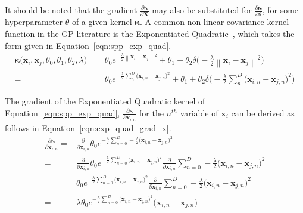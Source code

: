 It should be noted that the gradient \( \frac{\partial \bm{\kappa}}{\partial \bm{X}} \)
may also be substituted for \( \frac{\partial \bm{\kappa}}{\partial \theta} \), for 
some hyperparameter \( \theta \) of a given kernel \( \bm{\kappa} \). A common non-linear covariance 
kernel function in the GP literature is the Exponentiated Quadratic~\cite{Lawrence2005}, which takes 
the form given in Equation~\ref{eqn:spp_exp_quad}.
\begin{align}
  \label{eqn:spp_exp_quad}
  \bm{\kappa} \big( \bm{x}_{i}, \bm{x}_{j}, \theta_{0}, 
  \theta_{1}, \theta_{2}, \lambda \big) ={}&
  \theta_{0} e^{-\frac{\lambda}{2} 
  \left\lVert \bm{x}_{i} - \bm{x}_{j} \right\rVert^{2}}
  + \theta_{1} + \theta_{2} \delta \big( -\frac{\lambda}{2} 
  \left\lVert \bm{x}_{i} - \bm{x}_{j} \right\rVert^{2} \big)\\
  ={}& \theta_{0} e^{-\frac{\lambda}{2} 
  \sum_{n}^{D} {\big( \bm{x}_{i, n} - \bm{x}_{j, n} \big)}^{2}}
  + \theta_{1} + \theta_{2} \delta \big( -\frac{\lambda}{2} 
  \sum_{n}^{D} {\big( \bm{x}_{i, n} - \bm{x}_{j, n} \big)}^{2} \big)
\end{align}

The gradient of the Exponentiated Quadratic kernel of Equation~\ref{eqn:spp_exp_quad},
\( \frac{\partial \bm{\kappa}}{\partial \bm{x}_{i, n}} \) for the \( n^{th} \) variable 
of \( \bm{x}_{i} \) can be derived as follows in Equation~\ref{eqn:exp_quad_grad_x}.
\begin{align}
  \label{eqn:exp_quad_grad_x}
  \frac{\partial \bm{\kappa}}{\partial \bm{x}_{i, n}} ={}& 
  \frac{\partial}{\partial \bm{x}_{i, n}} \theta_{0} e^{-\frac{\lambda}{2} 
  \sum_{n = 0}^{D} -\frac{\lambda}{2} {\big( \bm{x}_{i, n} - \bm{x}_{j, n} \big)}^{2}}\\
  ={}& \frac{\partial}{\partial \bm{x}_{i, n}} \theta_{0} e^{-\frac{\lambda}{2} 
  \sum_{n = 0}^{D} {\big( \bm{x}_{i, n} - \bm{x}_{j, n} \big)}^{2}} 
  \frac{\partial}{\partial \bm{x}_{i, n}} \sum_{n = 0}^{D} -\frac{\lambda}{2} 
  {\big( \bm{x}_{i, n} - \bm{x}_{j, n} \big)}^{2}\\
  ={}& \theta_{0} e^{-\frac{\lambda}{2} 
  \sum_{n = 0}^{D} {\big( \bm{x}_{i, n} - \bm{x}_{j, n} \big)}^{2}} 
  \frac{\partial}{\partial \bm{x}_{i, n}} \sum_{n = 0}^{D} -\frac{\lambda}{2} 
  {\big( \bm{x}_{i, n} - \bm{x}_{j, n} \big)}^{2}\\
  ={}& \lambda \theta_{0} e^{-\frac{\lambda}{2} 
  \sum_{n = 0}^{D} {\big( \bm{x}_{i, n} - \bm{x}_{j, n} \big)}^{2}} 
  {\big( \bm{x}_{i, n} - \bm{x}_{j, n} \big)}
\end{align}

